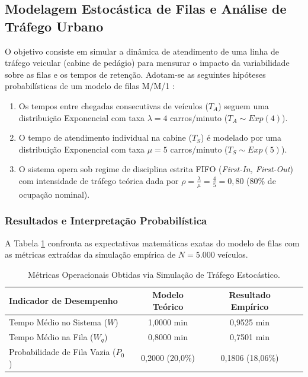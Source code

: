 \subsection{Modelagem Estocástica de Filas e Análise de Tráfego Urbano}

O objetivo consiste em simular a dinâmica de atendimento de uma linha de tráfego veicular (cabine de pedágio) para mensurar o impacto da variabilidade sobre as filas e os tempos de retenção. Adotam-se as seguintes hipóteses probabilísticas de um modelo de filas M/M/1 \cite{ross2024models}:
\begin{enumerate}
    \item Os tempos entre chegadas consecutivas de veículos ($T_A$) seguem uma distribuição Exponencial com taxa $\lambda = 4$ carros/minuto ($T_A \sim Exp(4)$).
    \item O tempo de atendimento individual na cabine ($T_S$) é modelado por uma distribuição Exponencial com taxa $\mu = 5$ carros/minuto ($T_S \sim Exp(5)$).
    \item O sistema opera sob regime de disciplina estrita FIFO (\textit{First-In, First-Out}) com intensidade de tráfego teórica dada por $\rho = \frac{\lambda}{\mu} = \frac{4}{5} = 0{,}80$ (80\% de ocupação nominal).
\end{enumerate}

\subsubsection{Resultados e Interpretação Probabilística}

A Tabela \ref{tab:t6_resultados} confronta as expectativas matemáticas exatas do modelo de filas com as métricas extraídas da simulação empírica de $N = 5.000$ veículos.

\begin{table}[H]
    \centering
    \caption{Métricas Operacionais Obtidas via Simulação de Tráfego Estocástico.}
    \label{tab:t6_resultados}
    \vspace{2mm}
    \begin{tabular}{lccc}
        \toprule
        \textbf{Indicador de Desempenho} & \textbf{Modelo Teórico} & \textbf{Resultado Empírico} \\ \midrule
        Tempo Médio no Sistema ($W$) & 1,0000 min & 0,9525 min \\
        Tempo Médio na Fila ($W_q$) & 0,8000 min & 0,7501 min \\
        Probabilidade de Fila Vazia ($P_0$) & 0,2000 (20,0\%) & 0,1806 (18,06\%) \\ \bottomrule
    \end{tabular}
\end{table}

